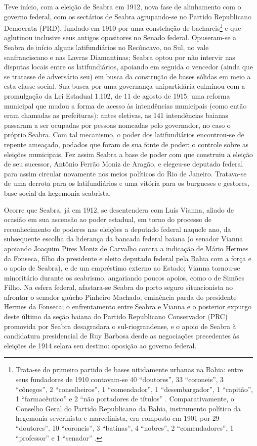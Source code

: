 Teve início, com a eleição de Seabra em 1912, nova fase de alinhamento com o governo federal, com os sectários de Seabra agrupando-se no Partido Republicano Democrata (PRD), fundado em 1910 por uma constelação de bachareis\footnote{Trata-se do primeiro partido de bases nitidamente urbanas na Bahia: entre seus fundadores de 1910 contavam-se 40 ``doutores'', 33 ``coroneis'', 3 ``cônegos'', 2 ``conselheiros'', 1 ``comendador'', 1 ``desembargador'', 1 ``capitão'', 1 ``farmacêutico'' e 2 ``não portadores de títulos'' \cite[p.~70]{sampaio_partidos_1978}. Comparativamente, o Conselho Geral do Partido Republicano da Bahia, instrumento político da hegemonia severinista e marcelinista, era composto em 1901 por 29 ``doutores'', 10 ``coroneis'', 3 ``batinas'',  4 ``nobres'', 2 ``comendadores'', 1 ``professor'' e 1 ``senador'' \cite[p.~49]{sampaio_partidos_1978}.} e que aglutinou inclusive seus antigos opositores no Senado federal. Opuseram-se a Seabra de início alguns latifundiários no Recôncavo, no Sul, no vale sanfranciscano e nas Lavras Diamantinas; Seabra optou por não intervir nas disputas locais entre os latifundiários, apoiando em seguida o vencedor (ainda que se tratasse de adversário seu) em busca da construção de bases sólidas em meio a esta classe social. Sua busca por uma governança unipartidária culminou com a promulgação da Lei Estadual 1.102, de 11 de agosto de 1915: uma reforma municipal que mudou a forma de acesso às intendências municipais (como então eram chamadas as prefeituras): antes eletivas, as 141 intendências baianas passaram a ser ocupadas por pessoas nomeadas pelo governador, no caso o próprio Seabra. Com tal mecanismo, o poder dos latifundiários encontrou-se de repente ameaçado, podados que foram de sua fonte de poder: o controle sobre as eleições municipais. Fez assim Seabra a base de poder com que construiu a eleição de seu sucessor, Antônio Ferrão Moniz de Aragão, e elegeu-se deputado federal para assim circular novamente nos meios políticos do Rio de Janeiro. Tratava-se de uma derrota para os latifundiários e uma vitória para os burgueses e gestores, base social da hegemonia seabrista.

Ocorre que Seabra, já em 1912, se desentendera com Luís Vianna, aliado de ocasião em sua ascensão ao poder estadual, em torno do processo de reconhecimento de poderes nas eleições a deputado federal naquele ano, da subsequente escolha da liderança da bancada federal baiana (o senador Vianna apoiando Joaquim Pires Moniz de Carvalho contra a indicação de Mário Hermes da Fonseca, filho do presidente e eleito deputado federal pela Bahia com a força e o apoio de Seabra), e de um empréstimo externo ao Estado; Vianna tornou-se minoritário durante os seabrismo, angariando poucos apoios, como o de Simões Filho. Na esfera federal, afastara-se Seabra do porto seguro situacionista ao afrontar o senador gaúcho Pinheiro Machado, eminência parda do presidente Hermes da Fonseca; o enfrentamento entre Seabra e Vianna e o posterior expurgo deste último da seção baiana do Partido Republicano Conservador (PRC) promovida por Seabra desagradara o sul-riograndense, e o apoio de Seabra à candidatura presidencial de Ruy Barbosa desde as negociações precedentes às eleições de 1914 selara seu destino: oposição ao governo federal.

